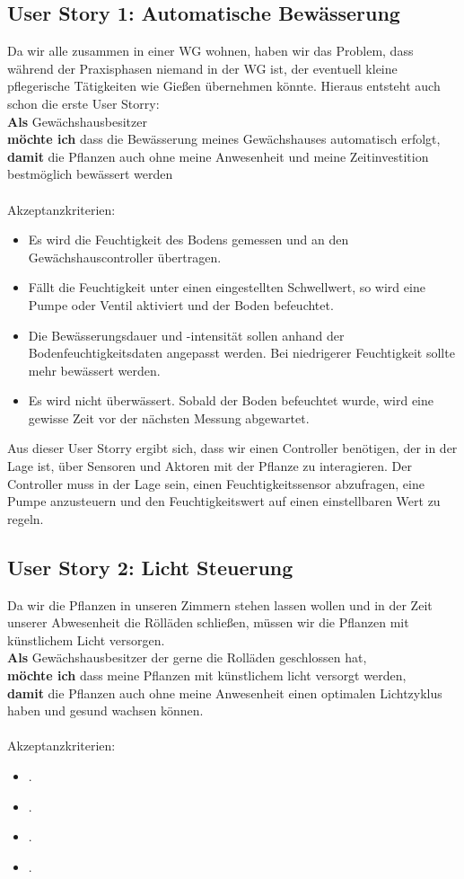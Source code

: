 \subsection{User Story 1: Automatische Bewässerung}
Da wir alle zusammen in einer WG wohnen, haben wir das Problem, dass während der Praxisphasen niemand in der WG ist, der eventuell kleine pflegerische Tätigkeiten wie Gießen übernehmen könnte. Hieraus entsteht auch schon die erste User Storry:\\
\textbf{Als} Gewächshausbesitzer \\
\textbf{möchte ich} dass die Bewässerung meines Gewächshauses automatisch erfolgt, \\
\textbf{damit} die Pflanzen auch ohne meine Anwesenheit und meine Zeitinvestition bestmöglich bewässert werden
\\ \\
Akzeptanzkriterien: 
\begin{itemize}
    \item Es wird die Feuchtigkeit des Bodens gemessen und an den Gewächshauscontroller übertragen.
    \item Fällt die Feuchtigkeit unter einen eingestellten Schwellwert, so wird eine Pumpe oder Ventil aktiviert und der Boden befeuchtet.
    \item Die Bewässerungsdauer und -intensität sollen anhand der Bodenfeuchtigkeitsdaten angepasst werden. Bei niedrigerer Feuchtigkeit sollte mehr bewässert werden.
    \item Es wird nicht überwässert. Sobald der Boden befeuchtet wurde, wird eine gewisse Zeit vor der nächsten Messung abgewartet.
\end{itemize}
Aus dieser User Storry ergibt sich, dass wir einen Controller benötigen, der in der Lage ist, über Sensoren und Aktoren mit der Pflanze zu interagieren. Der Controller muss in der Lage sein, einen Feuchtigkeitssensor abzufragen, eine Pumpe anzusteuern und den Feuchtigkeitswert auf einen einstellbaren Wert zu regeln.  


\subsection{User Story 2: Licht Steuerung}
Da wir die Pflanzen in unseren Zimmern stehen lassen wollen und in der Zeit unserer Abwesenheit die Rölläden schließen, müssen wir die Pflanzen mit künstlichem Licht versorgen. 
\\
\textbf{Als} Gewächshausbesitzer der gerne die Rolläden geschlossen hat,\\
\textbf{möchte ich} dass meine Pflanzen mit künstlichem licht versorgt werden, \\
\textbf{damit} die Pflanzen auch ohne meine Anwesenheit einen optimalen Lichtzyklus haben und gesund wachsen können.
\\ \\
Akzeptanzkriterien: 
\begin{itemize}
    \item .
    \item .
    \item .
    \item .
\end{itemize}


\pagebreak